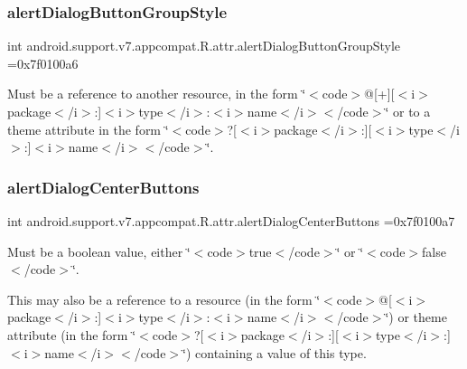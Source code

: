 \subsubsection{\texorpdfstring{alert\+Dialog\+Button\+Group\+Style}{alertDialogButtonGroupStyle}}
{\footnotesize\ttfamily int android.\+support.\+v7.\+appcompat.\+R.\+attr.\+alert\+Dialog\+Button\+Group\+Style =0x7f0100a6\hspace{0.3cm}{\ttfamily [static]}}

Must be a reference to another resource, in the form \char`\"{}$<$code$>$@\mbox{[}+\mbox{]}\mbox{[}$<$i$>$package$<$/i$>$\+:\mbox{]}$<$i$>$type$<$/i$>$\+:$<$i$>$name$<$/i$>$$<$/code$>$\char`\"{} or to a theme attribute in the form \char`\"{}$<$code$>$?\mbox{[}$<$i$>$package$<$/i$>$\+:\mbox{]}\mbox{[}$<$i$>$type$<$/i$>$\+:\mbox{]}$<$i$>$name$<$/i$>$$<$/code$>$\char`\"{}. \mbox{\label{classandroid_1_1support_1_1v7_1_1appcompat_1_1R_1_1attr_a660258c26951fc3dae1b71e792e182ce}} 
\subsubsection{\texorpdfstring{alert\+Dialog\+Center\+Buttons}{alertDialogCenterButtons}}
{\footnotesize\ttfamily int android.\+support.\+v7.\+appcompat.\+R.\+attr.\+alert\+Dialog\+Center\+Buttons =0x7f0100a7\hspace{0.3cm}{\ttfamily [static]}}

Must be a boolean value, either \char`\"{}$<$code$>$true$<$/code$>$\char`\"{} or \char`\"{}$<$code$>$false$<$/code$>$\char`\"{}. 

This may also be a reference to a resource (in the form \char`\"{}$<$code$>$@\mbox{[}$<$i$>$package$<$/i$>$\+:\mbox{]}$<$i$>$type$<$/i$>$\+:$<$i$>$name$<$/i$>$$<$/code$>$\char`\"{}) or theme attribute (in the form \char`\"{}$<$code$>$?\mbox{[}$<$i$>$package$<$/i$>$\+:\mbox{]}\mbox{[}$<$i$>$type$<$/i$>$\+:\mbox{]}$<$i$>$name$<$/i$>$$<$/code$>$\char`\"{}) containing a value of this type. \mbox{\label{classandroid_1_1support_1_1v7_1_1appcompat_1_1R_1_1attr_a042bf450c17c2f3a1a989383edb17c70}} 
